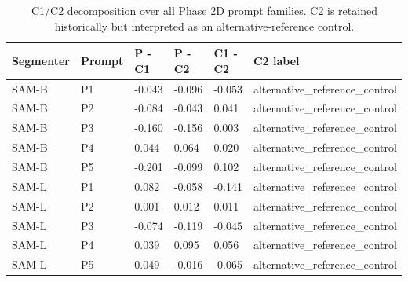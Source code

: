 \begin{table}[t]
\centering
\small
\caption{C1/C2 decomposition over all Phase 2D prompt families. C2 is retained historically but interpreted as an alternative-reference control.}
\label{tab:control_decomposition}
\begin{tabular}{llllll}
\hline
Segmenter & Prompt & P - C1 & P - C2 & C1 - C2 & C2 label \\
\hline
SAM-B & P1 & -0.043 & -0.096 & -0.053 & alternative\_reference\_control \\
SAM-B & P2 & -0.084 & -0.043 & 0.041 & alternative\_reference\_control \\
SAM-B & P3 & -0.160 & -0.156 & 0.003 & alternative\_reference\_control \\
SAM-B & P4 & 0.044 & 0.064 & 0.020 & alternative\_reference\_control \\
SAM-B & P5 & -0.201 & -0.099 & 0.102 & alternative\_reference\_control \\
SAM-L & P1 & 0.082 & -0.058 & -0.141 & alternative\_reference\_control \\
SAM-L & P2 & 0.001 & 0.012 & 0.011 & alternative\_reference\_control \\
SAM-L & P3 & -0.074 & -0.119 & -0.045 & alternative\_reference\_control \\
SAM-L & P4 & 0.039 & 0.095 & 0.056 & alternative\_reference\_control \\
SAM-L & P5 & 0.049 & -0.016 & -0.065 & alternative\_reference\_control \\
\hline
\end{tabular}
\end{table}
